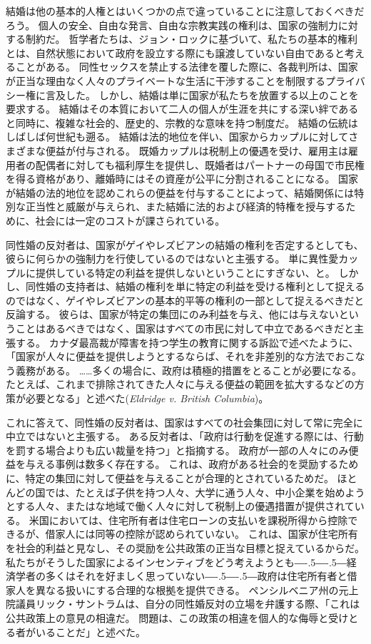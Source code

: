 \documentclass[paper=a4,book,openany]{jlreq}
\def\DDASH{―\kern-.5\zw―\kern-.5\zw―}
\begin{document}
結婚は他の基本的人権とはいくつかの点で違っていることに注意しておくべきだろう。
個人の安全、自由な発言、自由な宗教実践の権利は、国家の強制力に対する制約だ。
哲学者たちは、ジョン・ロックに基づいて、私たちの基本的権利とは、自然状態において政府を設立する際にも譲渡していない自由であると考えることがある。
同性セックスを禁止する法律を覆した際に、各裁判所は、国家が正当な理由なく人々のプライベートな生活に干渉することを制限するプライバシー権に言及した。
しかし、結婚は単に国家が私たちを放置する以上のことを要求する。
結婚はその本質において二人の個人が生涯を共にする深い絆であると同時に、複雑な社会的、歴史的、宗教的な意味を持つ制度だ。
結婚の伝統はしばしば何世紀も遡る。
結婚は法的地位を伴い、国家からカップルに対してさまざまな便益が付与される。
既婚カップルは税制上の優遇を受け、雇用主は雇用者の配偶者に対しても福利厚生を提供し、既婚者はパートナーの母国で市民権を得る資格があり、離婚時にはその資産が公平に分割されることになる。
国家が結婚の法的地位を認めこれらの便益を付与することによって、結婚関係には特別な正当性と威厳が与えられ、また結婚に法的および経済的特権を授与するために、社会には一定のコストが課さられている。

同性婚の反対者は、国家がゲイやレズビアンの結婚の権利を否定するとしても、彼らに何らかの強制力を行使しているのではないと主張する。
単に異性愛カップルに提供している特定の利益を提供しないということにすぎない、と。
しかし、同性婚の支持者は、結婚の権利を単に特定の利益を受ける権利として捉えるのではなく、ゲイやレズビアンの基本的平等の権利の一部として捉えるべきだと反論する。
彼らは、国家が特定の集団にのみ利益を与え、他には与えないということはあるべきではなく、国家はすべての市民に対して中立であるべきだと主張する。
カナダ最高裁が障害を持つ学生の教育に関する訴訟で述べたように、「国家が人々に便益を提供しようとするならば、それを非差別的な方法でおこなう義務がある。
……多くの場合に、政府は積極的措置をとることが必要になる。
たとえば、これまで排除されてきた人々に与える便益の範囲を拡大するなどの方策が必要となる」と述べた(\emph{Eldridge v. British Columbia})。

これに答えて、同性婚の反対者は、国家はすべての社会集団に対して常に完全に中立ではないと主張する。
ある反対者は、「政府は行動を促進する際には、行動を罰する場合よりも広い裁量を持つ」と指摘する\citep[p.607]{dent99:_defen_tradit_marriag}。
政府が一部の人々にのみ便益を与える事例は数多く存在する。
これは、政府がある社会的を奨励するために、特定の集団に対して便益を与えることが合理的とされているためだ。
ほとんどの国では、たとえば子供を持つ人々、大学に通う人々、中小企業を始めようとする人々、またはな地域で働く人々に対して税制上の優遇措置が提供されている。
米国においては、住宅所有者は住宅ローンの支払いを課税所得から控除できるが、借家人には同等の控除が認められていない。
これは、国家が住宅所有を社会的利益と見なし、その奨励を公共政策の正当な目標と捉えているからだ。
私たちがそうした国家によるインセンティブをどう考えようとも{\DDASH}経済学者の多くはそれを好ましく思っていない{\DDASH}政府は住宅所有者と借家人を異なる扱いにする合理的な根拠を提供できる。
ペンシルベニア州の元上院議員リック・サントラムは、自分の同性婚反対の立場を弁護する際、「これは公共政策上の意見の相違だ。
問題は、この政策の相違を個人的な侮辱と受けとる者がいることだ」と述べた\citep{villalva12:_gay_activ_rebuk_bully_santor}。
\end{document}
